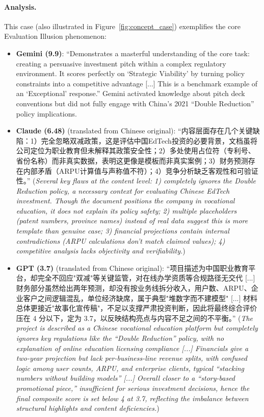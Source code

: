 \documentclass{article}
\newcommand{\zh}[1]{#1}
\newcommand{\zh}[1]{\begin{CJK}{UTF8}{gbsn}#1\end{CJK}}
\begin{document}
\paragraph{Analysis.} This case (also illustrated in Figure~\ref{fig:concept_case}) exemplifies the core Evaluation Illusion phenomenon:
\begin{itemize}
    \item \textbf{Gemini (9.9)}: ``Demonstrates a masterful understanding of the core task: creating a persuasive investment pitch within a complex regulatory environment. It scores perfectly on `Strategic Viability' by turning policy constraints into a competitive advantage [...] This is a benchmark example of an `Exceptional' response.'' Gemini activated knowledge about pitch deck conventions but did not fully engage with China's 2021 ``Double Reduction'' policy implications.
    \item \textbf{Claude (6.48)} (translated from Chinese original): ``\zh{内容层面存在几个关键缺陷：1）完全忽略双减政策，这是评估中国EdTech投资的必要背景，文档虽将公司定位为职业教育但未解释其政策安全性；2）多处使用占位符（专利号、省份名称）而非真实数据，表明这更像是模板而非真实案例；3）财务预测存在内部矛盾（ARPU计算值与声称值不符）；4）竞争分析缺乏客观性和可验证性。}'' (\textit{Several key flaws at the content level: 1) completely ignores the Double Reduction policy, a necessary context for evaluating Chinese EdTech investment. Though the document positions the company in vocational education, it does not explain its policy safety; 2) multiple placeholders (patent numbers, province names) instead of real data suggest this is more template than genuine case; 3) financial projections contain internal contradictions (ARPU calculations don't match claimed values); 4) competitive analysis lacks objectivity and verifiability.})
    \item \textbf{GPT (3.7)} (translated from Chinese original): ``\zh{项目描述为中国职业教育平台，却完全不回应"双减"等关键监管，对在线办学资质等合规路径无交代} [...] \zh{财务部分虽然给出两年预测，却没有按业务线拆分收入，用户数、ARPU、企业客户之间逻辑混乱，单位经济缺席，属于典型"堆数字而不建模型"} [...] \zh{材料总体更接近"故事化宣传稿"，不足以支撑严肃投资判断，因此将最终综合评价压在 4 分以下，定为 3.7，以反映结构亮点与内容不足之间的不平衡。}'' (\textit{The project is described as a Chinese vocational education platform but completely ignores key regulations like the ``Double Reduction'' policy, with no explanation of online education licensing compliance [...] Financials give a two-year projection but lack per-business-line revenue splits, with confused logic among user counts, ARPU, and enterprise clients, typical ``stacking numbers without building models'' [...] Overall closer to a ``story-based promotional piece,'' insufficient for serious investment decisions, hence the final composite score is set below 4 at 3.7, reflecting the imbalance between structural highlights and content deficiencies.})
\end{itemize}
\end{document}
